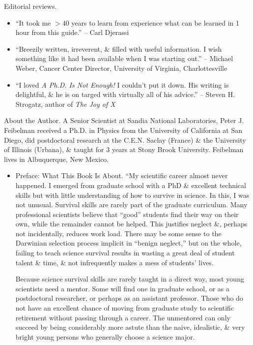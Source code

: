 \documentclass{article}
\begin{document}
\begin{enumerate}
	{\sf Editorial reviews.}
	\begin{itemize}
		\item ``It took me $> 40$ years to learn from experience what can be learned in 1 hour from this guide.'' -- {\sc Carl Djerassi}
		\item ``Breezily written, irreverent, \& filled with useful information. I wish something like it had been available when I was starting out.'' -- {\sc Michael Weber}, Cancer Center Director, University of Virginia, Charlottesville
		\item ``I loved {\it A Ph.D. Is Not Enough!} I couldn't put it down. His writing is delightful, \& he is on targed with virtually all of his advice.'' -- {\sc Steven H. Strogatz}, author of {\it The Joy of X}
	\end{itemize}
	{\sf About the Author.}  A Senior Scientist at Sandia National Laboratories, {\sc Peter J. Feibelman} received a Ph.D. in Physics from the University of California at San Diego, did postdoctoral research at the C.E.N. Saclay (France) \& the University of Illinois (Urbana), \& taught for 3 years at Stony Brook University. {\sc Feibelman} lives in Albuquerque, New Mexico.
	\begin{itemize}
		\item {\sf Preface: What This Book Is About.} ``My scientific career almost never happened. I emerged from graduate school with a PhD \& excellent technical skills but with little understanding of how to survive in science. In this, I was not unusual. Survival skills are rarely part of the graduate curriculum. Many professional scientists believe that ``good'' students find their way on their own, while the remainder cannot be helped. This justifies neglect \&, perhaps not incidentally, reduces work load. There may be some sense to the Darwinian selection process implicit in ``benign neglect,'' but on the whole, failing to teach science survival results in wasting a great deal of student talent \& time, \& not infrequently makes a mess of students' lives.

		Because science survival skills are rarely taught in a direct way, most young scientists need a mentor. Some will find one in graduate school, or as a postdoctoral researcher, or perhaps as an assistant professor. Those who do not have an excellent chance of moving from graduate study to scientific retirement without passing through a career. The unmentored can only succeed by being considerably more astute than the naive, idealistic, \& very bright young persons who generally choose a science major.


\end{itemize}
\end{enumerate}
\end{document}

